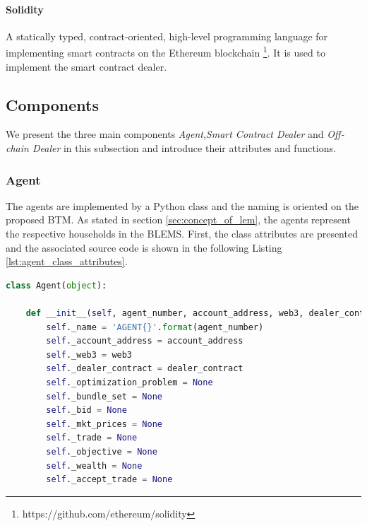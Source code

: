 \paragraph{Solidity}
A statically typed, contract-oriented, high-level programming language for implementing smart contracts on the Ethereum
blockchain \footnote{https://github.com/ethereum/solidity}.
It is used to implement the smart contract dealer. 

\clearpage
\subsection{Components}
\label{sec:components_of_simulation}
We present the three main components \textit{Agent},\textit{Smart Contract Dealer} and \textit{Off-chain Dealer} 
in this subsection and introduce their attributes and functions. 

\subsubsection{Agent}
\label{sec:agent_class}
The agents are implemented by a Python class and the naming is oriented on the proposed BTM.
As stated in section \ref{sec:concept_of_lem}, the agents represent the respective households in the BLEMS. 
First, the class attributes are presented and the associated source code is shown
in the following Listing \ref{lst:agent_class_attributes}.

\begin{lstlisting}[label=lst:agent_class_attributes, caption=Overview of the agent class attributes, language=Python]
    class Agent(object):

    def __init__(self, agent_number, account_address, web3, dealer_contract):
        self._name = 'AGENT{}'.format(agent_number)
        self._account_address = account_address
        self._web3 = web3
        self._dealer_contract = dealer_contract
        self._optimization_problem = None
        self._bundle_set = None
        self._bid = None
        self._mkt_prices = None
        self._trade = None
        self._objective = None
        self._wealth = None
        self._accept_trade = None
\end{lstlisting}

